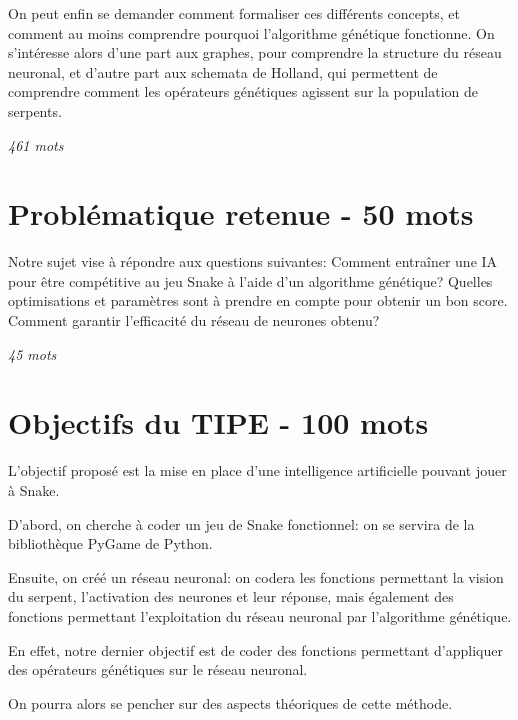 \documentclass[11pt,a4paper]{article}
\begin{document}

On peut enfin se demander comment formaliser ces différents concepts, et comment au moins comprendre pourquoi l'algorithme génétique fonctionne.
On s'intéresse alors d'une part aux graphes, pour comprendre la structure du réseau neuronal, et d'autre part aux schemata de Holland, qui permettent de comprendre comment les opérateurs génétiques agissent sur la population de serpents.



\textit{461 mots}

\section{Problématique retenue - 50 mots}

Notre sujet vise à répondre aux questions suivantes:
Comment entraîner une IA pour être compétitive au jeu Snake à l'aide d'un algorithme génétique?
Quelles optimisations et paramètres sont à prendre en compte pour obtenir un bon score.
Comment garantir l'efficacité du réseau de neurones obtenu?

\textit{45 mots}

\section{Objectifs du TIPE - 100 mots}

L'objectif proposé est la mise en place d'une intelligence artificielle pouvant jouer à Snake.

D'abord, on cherche à coder un jeu de Snake fonctionnel: on se servira de la bibliothèque PyGame de Python.

Ensuite, on créé un réseau neuronal: on codera les fonctions permettant la vision du serpent, l'activation des neurones et leur réponse, mais également des fonctions permettant l'exploitation du réseau neuronal par l'algorithme génétique.

En effet, notre dernier objectif est de coder des fonctions permettant d'appliquer des opérateurs génétiques sur le réseau neuronal.

On pourra alors se pencher sur des aspects théoriques de cette méthode.
\end{document}
